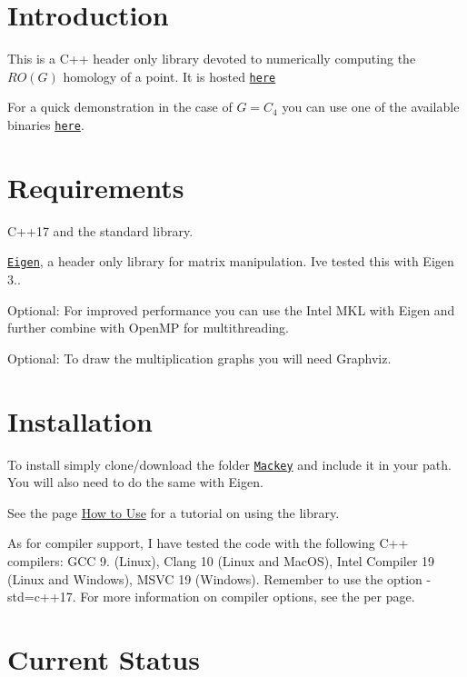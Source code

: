 \hypertarget{index_intro}{}\section{Introduction}\label{index_intro}
This is a C++ header only library devoted to numerically computing the $RO(G)$ homology of a point. It is hosted \href{https://github.com/NickG-Math/Mackey}{\tt here}

For a quick demonstration in the case of $G=C_4$ you can use one of the available binaries \href{https://github.com/NickG-Math/Mackey/tree/master/bin}{\tt here}.\hypertarget{index_req}{}\section{Requirements}\label{index_req}

\begin{DoxyItemize}
\item C++17 and the standard library.
\item \href{ http://eigen.tuxfamily.org/index.php?title=Main_Page}{\tt Eigen}, a header only library for matrix manipulation. I\textquotesingle{}ve tested this with Eigen 3..
\item Optional\+: For improved performance you can use the Intel M\+KL with Eigen and further combine with Open\+MP for multithreading.
\item Optional\+: To draw the multiplication graphs you will need Graphviz.
\end{DoxyItemize}\hypertarget{index_install}{}\section{Installation}\label{index_install}

\begin{DoxyItemize}
\item To install simply clone/download the folder \href{https://github.com/NickG-Math/Mackey/tree/master/Mackey/tree/master/Mackey}{\tt Mackey} and include it in your path. You will also need to do the same with Eigen.
\item See the page \hyperlink{use}{How to Use} for a tutorial on using the library.
\item As for compiler support, I have tested the code with the following C++ compilers\+: G\+CC 9. (Linux), Clang 10 (Linux and Mac\+OS), Intel Compiler 19 (Linux and Windows), M\+S\+VC 19 (Windows). Remember to use the option {\ttfamily -\/std=c++17}. For more information on compiler options, see the per page.
\end{DoxyItemize}\hypertarget{index_status}{}\section{Current Status}\label{index_status}

